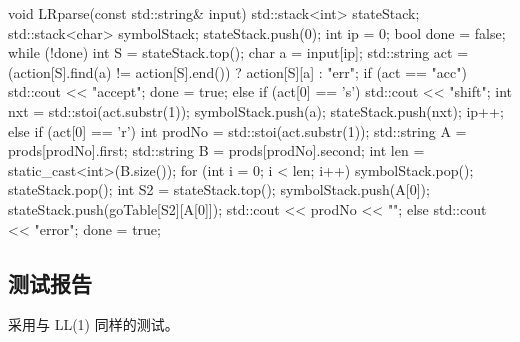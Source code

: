\begin{cppcode}
void LRparse(const std::string& input)
{
    std::stack<int> stateStack;
    std::stack<char> symbolStack;
    stateStack.push(0);
    int ip = 0;
    bool done = false;
    while (!done) {
        int S = stateStack.top();
        char a = input[ip];
        std::string act = (action[S].find(a) != action[S].end()) ? action[S][a] : "err";
        if (act == "acc") {
            std::cout << "accept\n";
            done = true;
        } else if (act[0] == 's') {
            std::cout << "shift\n";
            int nxt = std::stoi(act.substr(1));
            symbolStack.push(a);
            stateStack.push(nxt);
            ip++;
        } else if (act[0] == 'r') {
            int prodNo = std::stoi(act.substr(1));
            std::string A = prods[prodNo].first;
            std::string B = prods[prodNo].second;
            int len = static_cast<int>(B.size());
            for (int i = 0; i < len; i++) {
                symbolStack.pop();
                stateStack.pop();
            }
            int S2 = stateStack.top();
            symbolStack.push(A[0]);
            stateStack.push(goTable[S2][A[0]]);
            std::cout << prodNo << "\n";
        } else {
            std::cout << "error\n";
            done = true;
        }
    }
}
\end{cppcode}

\subsection{测试报告}

采用与 LL(1) 同样的测试。

